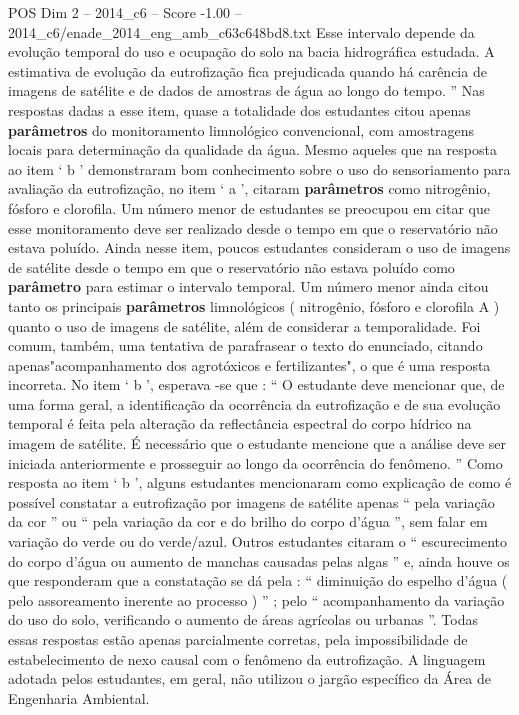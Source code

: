 \begin{textsample}{POS Dim 2 – 2014\_c6 – Score -1.00 – 2014\_c6/enade\_2014\_eng\_amb\_c63c648bd8.txt}
Esse intervalo depende da evolução temporal do uso e ocupação do solo na bacia hidrográfica estudada.
A estimativa de evolução da eutrofização fica prejudicada quando há carência de imagens de satélite e de dados de amostras de água ao longo do tempo. ” Nas respostas dadas a esse item, quase a totalidade dos estudantes citou apenas \textbf{parâmetros} do monitoramento limnológico convencional, com amostragens locais para determinação da qualidade da água.
Mesmo aqueles que na resposta ao item ‘ b ’ demonstraram bom conhecimento sobre o uso do sensoriamento para avaliação da eutrofização, no item ‘ a ’, citaram \textbf{parâmetros} como nitrogênio, fósforo e clorofila.
Um número menor de estudantes se preocupou em citar que esse monitoramento deve ser realizado desde o tempo em que o reservatório não estava poluído.
Ainda nesse item, poucos estudantes consideram o uso de imagens de satélite desde o tempo em que o reservatório não estava poluído como \textbf{parâmetro} para estimar o intervalo temporal.
Um número menor ainda citou tanto os principais \textbf{parâmetros} limnológicos ( nitrogênio, fósforo e clorofila A ) quanto o uso de imagens de satélite, além de considerar a temporalidade.
Foi comum, também, uma tentativa de parafrasear o texto do enunciado, citando apenas"acompanhamento dos agrotóxicos e fertilizantes", o que é uma resposta incorreta.
No item ‘ b ’, esperava -se que : “ O estudante deve mencionar que, de uma forma geral, a identificação da ocorrência da eutrofização e de sua evolução temporal é feita pela alteração da reflectância espectral do corpo hídrico na imagem de satélite.
É necessário que o estudante mencione que a análise deve ser iniciada anteriormente e prosseguir ao longo da ocorrência do fenômeno. ” Como resposta ao item ‘ b ’, alguns estudantes mencionaram como explicação de como é possível constatar a eutrofização por imagens de satélite apenas “ pela variação da cor ” ou “ pela variação da cor e do brilho do corpo d’água ”, sem falar em variação do verde ou do verde/azul.
Outros estudantes citaram o “ escurecimento do corpo d’água ou aumento de manchas causadas pelas algas ” e, ainda houve os que responderam que a constatação se dá pela : “ diminuição do espelho d’água ( pelo assoreamento inerente ao processo ) ” ; pelo “ acompanhamento da variação do uso do solo, verificando o aumento de áreas agrícolas ou urbanas ”.
Todas essas respostas estão apenas parcialmente corretas, pela impossibilidade de estabelecimento de nexo causal com o fenômeno da eutrofização.
A linguagem adotada pelos estudantes, em geral, não utilizou o jargão específico da Área de Engenharia Ambiental.

\end{textsample}
